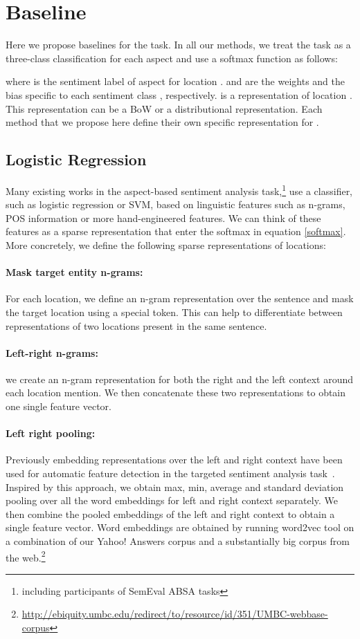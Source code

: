 \documentclass[11pt]{article}
\begin{document}
\section{Baseline}
        Here we propose baselines for the task. In all our methods, we treat the task as a three-class classification for each aspect and use a softmax function as follows:
        
        where  is the sentiment label of aspect  for location .  and  are the weights and the bias specific to each sentiment class , respectively.  is a representation of location . This representation can be a BoW or a distributional representation. Each method that we propose here define their own specific representation for . 
    \subsection{Logistic Regression}
        Many existing works in the aspect-based sentiment analysis task,\footnote{including participants of SemEval ABSA tasks} use a classifier, such as logistic regression or SVM, based on linguistic features such as n-grams, POS information or more hand-engineered features. We can think of these features as a sparse representation  that enter the softmax in equation \ref{softmax}. More concretely, we define the following sparse representations of locations:
        \paragraph{Mask target entity n-grams:} For each location, we define an n-gram representation over the sentence and mask the target location using a special token. This can help to differentiate between representations of two locations present in the same sentence.
        \paragraph{Left-right n-grams:} we create an n-gram representation for both the right and the left context around each location mention. We then concatenate these two representations to obtain one single feature vector.
        \paragraph{Left right pooling:} Previously embedding representations over the left and right context have been used for automatic feature detection in the targeted sentiment analysis task~\cite{vo2015target}.
        Inspired by this approach, we obtain max, min, average and standard deviation pooling over all the word embeddings for left and right context separately. We then combine the pooled embeddings of the left and right context to obtain a single feature vector. Word embeddings are obtained by running word2vec tool on a combination of our Yahoo! Answers corpus and a substantially big corpus from the web.\footnote{\url{http://ebiquity.umbc.edu/redirect/to/resource/id/351/UMBC-webbase-corpus}}
\end{document}
